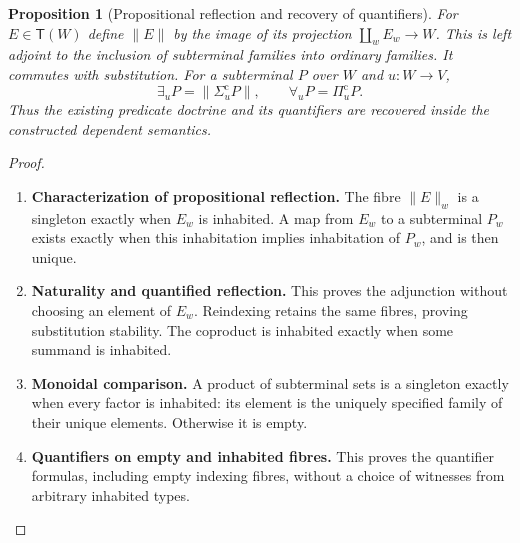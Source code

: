 \documentclass[11pt,a4paper]{article}
\numberwithin{equation}{section}
\newtheorem{proposition}[theorem]{Proposition}
\theoremstyle{definition}
\theoremstyle{remark}
\theoremstyle{plain}
\begin{document}
\begin{proposition}[Propositional reflection and recovery of quantifiers]
\label{prop:egt-propositional-recovery}
For $E\in\mathsf T(W)$ define $\|E\|$ by the image of its projection
$\coprod_w E_w\to W$. This is left adjoint to the inclusion of
subterminal families into ordinary families. It commutes with
substitution. For a subterminal $P$ over $W$ and $u:W\to V$,
\[
 \exists_uP=\|\Sigma_u^{\mathrm c}P\|,
 \qquad \forall_uP=\Pi_u^{\mathrm c}P.
\]
Thus the existing predicate doctrine and its quantifiers are recovered
inside the constructed dependent semantics.
\end{proposition}
\begin{proof}
\leavevmode
\begin{enumerate}[label=\textup{(\arabic*)},leftmargin=*,itemsep=4pt,topsep=3pt]
  \item \textbf{Characterization of propositional reflection.} The fibre $\|E\|_w$ is a singleton exactly when $E_w$ is inhabited. A map from $E_w$ to a subterminal $P_w$ exists exactly when this
inhabitation implies inhabitation of $P_w$, and is then unique.
  \item \textbf{Naturality and quantified reflection.} This proves the adjunction without choosing an element of $E_w$. Reindexing retains the same fibres, proving substitution stability. The coproduct is inhabited exactly when some summand is inhabited.
  \item \textbf{Monoidal comparison.} A product of subterminal sets is a singleton exactly when every factor
is inhabited: its element is the uniquely specified family of their
unique elements. Otherwise it is empty.
  \item \textbf{Quantifiers on empty and inhabited fibres.} This proves the quantifier
formulas, including empty indexing fibres, without a choice of witnesses
from arbitrary inhabited types.
\end{enumerate}
\end{proof}
\end{document}
